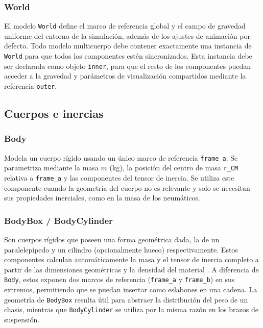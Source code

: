 \subsubsection{World}
El modelo \verb|World| define el marco de referencia global y el campo de gravedad uniforme del entorno de la simulación, además de los ajustes de animación por defecto. Todo modelo multicuerpo debe contener exactamente una instancia de \verb|World| para que todos los componentes estén sincronizados. Esta instancia debe ser declarada como objeto \texttt{inner}, para que el resto de los componentes puedan acceder a la gravedad y parámetros de visualización compartidos mediante la referencia \texttt{outer}.

\subsection*{Cuerpos e inercias}



\subsubsection{Body} 
Modela un cuerpo rígido usando un único marco de referencia \verb|frame_a|. Se parametriza mediante la masa $m$ (kg), la posición del centro de masa \verb|r_CM| relativa a \verb|frame_a| y las componentes del tensor de inercia. Se utiliza este componente cuando la geometría del cuerpo no es relevante y solo se necesitan sus propiedades inerciales, como en la masa de los neumáticos.



\subsubsection{BodyBox / BodyCylinder} 
Son cuerpos rígidos que poseen una forma geométrica dada, la de un paralelepípedo y un cilindro (opcionalmente hueco) respectivamente. Estos componentes calculan automáticamente la masa y el tensor de inercia completo a partir de las dimensiones geométricas y la densidad del material \cite{msl_multibody}. A diferencia de \verb|Body|, estos exponen dos marcos de referencia  (\verb|frame_a| y \verb|frame_b|) en sus extremos, permitiendo que se puedan insertar como eslabones en una cadena. La geometría de \verb|BodyBox| resulta útil para abstraer la distribución del peso de un chasis, mientras que \verb|BodyCylinder| se utiliza por la misma razón en los brazos de suspensión.



